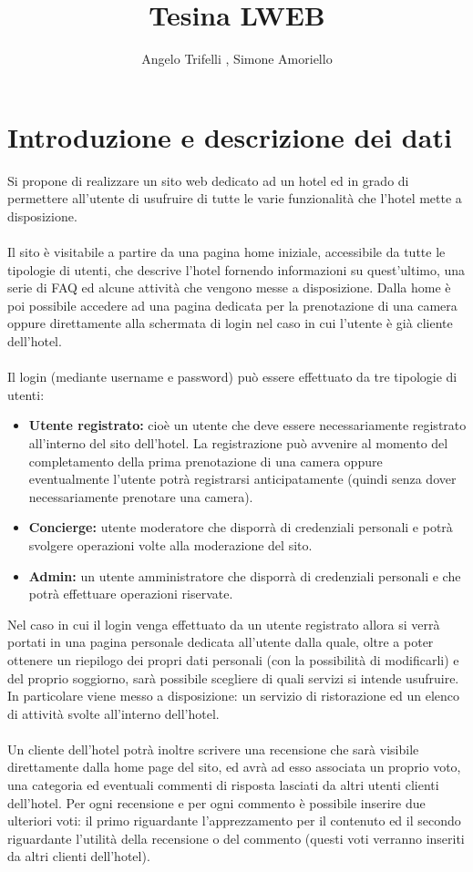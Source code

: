 \documentclass [a4paper, 12pt]{book}
\begin{document}
\author{Angelo Trifelli , Simone Amoriello}
\title{Tesina LWEB}
\maketitle
\tableofcontents

\chapter{Introduzione e descrizione dei dati}

Si propone di realizzare un sito web dedicato ad un hotel ed in grado di permettere all'utente di usufruire di tutte le varie funzionalità che l'hotel mette a disposizione.\\\\
Il sito è visitabile a partire da una pagina home iniziale, accessibile da tutte le tipologie di utenti, che descrive l'hotel fornendo informazioni su quest'ultimo, una serie di FAQ ed alcune attività che vengono messe a disposizione. Dalla home è poi possibile accedere ad una pagina dedicata per la prenotazione di una camera oppure direttamente alla schermata di login nel caso in cui l'utente è già cliente dell'hotel.\\\\
Il login (mediante username e password) può essere effettuato da tre tipologie di utenti:
\begin{itemize}
\item \textbf{Utente registrato:} cioè un utente che deve essere necessariamente registrato all'interno del sito dell'hotel. La registrazione può avvenire al momento del completamento della prima prenotazione di una camera oppure eventualmente l'utente potrà registrarsi anticipatamente (quindi senza dover necessariamente prenotare una camera).
\item \textbf{Concierge:} utente moderatore che disporrà di credenziali personali e potrà svolgere operazioni volte alla moderazione del sito.
\item \textbf{Admin:} un utente amministratore che disporrà di credenziali personali e che potrà effettuare operazioni riservate.
\end{itemize}
Nel caso in cui il login venga effettuato da un utente registrato allora si verrà portati in una pagina personale dedicata all'utente dalla quale, oltre a poter ottenere un riepilogo dei propri dati personali (con la possibilità di modificarli) e del proprio soggiorno, sarà possibile scegliere di quali servizi si intende usufruire. In particolare viene messo a disposizione: un servizio di ristorazione ed un elenco di attività svolte all'interno dell'hotel. \\\\Un cliente dell'hotel potrà inoltre scrivere una recensione che sarà visibile direttamente dalla home page del sito, ed avrà ad esso associata un proprio voto, una categoria ed eventuali commenti di risposta lasciati da altri utenti clienti dell'hotel. Per ogni recensione e per ogni commento è possibile inserire due ulteriori voti: il primo riguardante l'apprezzamento per il contenuto ed il secondo riguardante l'utilità della recensione o del commento (questi voti verranno inseriti da altri clienti dell'hotel).\\\\
\end{document}
